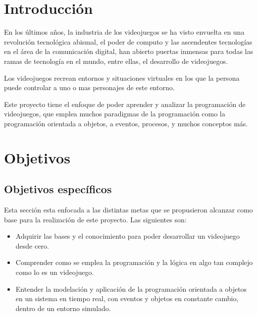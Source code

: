 \documentclass[12pt,letterpaper]{report}
\begin{document}
\chapter{Introducción} %

En los últimos años, la industria de los videojuegos se ha visto envuelta en una revolución tecnológica abismal, el poder de computo y las ascendentes tecnologías en el área de la comunicación digital, han abierto puertas inmensas para todas las ramas de tecnología en el mundo, entre ellas, el desarrollo de videojuegos.

Los videojuegos recrean entornos y situaciones virtuales en los que la persona puede controlar a uno o mas personajes de este entorno. 

Este proyecto tiene el enfoque de poder aprender y analizar la programación de videojuegos, que emplea muchos paradigmas de la programación como la programación orientada a objetos, a eventos, procesos, y muchos conceptos más. 

%
%
%
%
%

\chapter{Objetivos}

\section{Objetivos específicos}

Esta sección esta enfocada a las distintas metas que se propusieron alcanzar como base para la realización de este proyecto. Las siguientes son:

\begin{itemize}

\item Adquirir las bases y el conocimiento para poder desarrollar un videojuego desde cero.

\item Comprender como se emplea la programación y la lógica en algo tan complejo como lo es un videojuego.

\item Entender la modelación y aplicación de la programación orientada a objetos en un sistema en tiempo real, con eventos y objetos en constante cambio, dentro de un entorno simulado.

\end{itemize}
\end{document}
